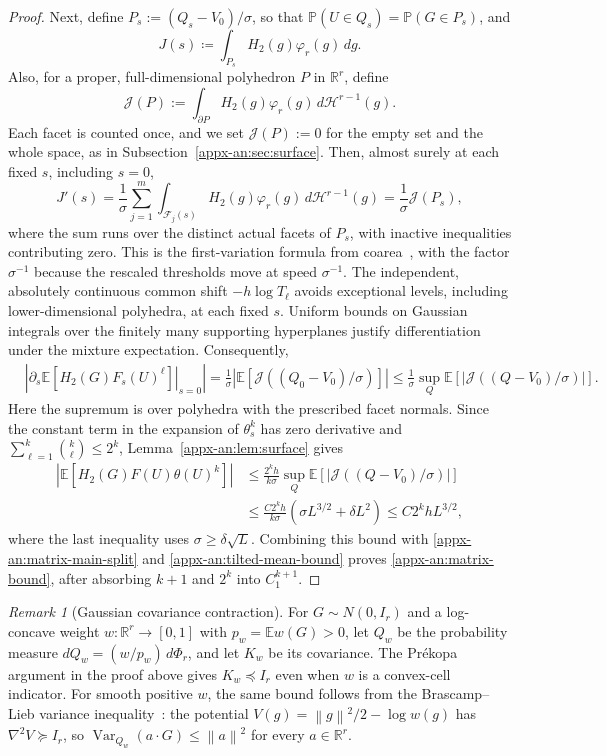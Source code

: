 \documentclass[11pt,letterpaper]{article}
\theoremstyle{remark}
\newtheorem{remark}{Remark}
\newcommand{\E}{\mathbb E}
\newcommand{\Pp}{\mathbb P}
\newcommand{\R}{\mathbb R}
\newcommand{\norm}[1]{\left\lVert#1\right\rVert}
\newcommand{\dd}{\,d}
\newcommand{\surf}{\mathcal J}
\begin{document}
\begin{proof}
Next, define $P_s :=(Q_s-V_0)/\sigma$, so that $\Pp(U\in Q_s) = \Pp(G\in P_s)$, and
\[
 J(s)\coloneqq
 \int_{P_s}H_2(g)\varphi_r(g)\,dg.
\]
Also, for a proper, full-dimensional polyhedron $P$ in $\R^r$, define
\[
\surf(P) :=\int_{\partial P}H_2(g)\varphi_r(g)\dd\mathcal H^{r-1}(g).
\]
Each facet is counted once, and we set $\surf(P):=0$ for the empty
set and the whole space, as in Subsection~\ref{appx-an:sec:surface}.
Then, almost surely at each fixed $s$, including $s=0$,
\[
 J'(s)=\frac1\sigma
 \sum_{j=1}^m
 \int_{\mathcal F_j(s)}
 H_2(g)\varphi_r(g)\,d\mathcal H^{r-1}(g)
 =\frac1\sigma\surf(P_s),
\]
where the sum runs over the distinct actual facets of $P_s$, with
inactive inequalities contributing zero. This is the first-variation
formula from coarea~\cite[Section~3.4]{EvansGariepy2015}, with the
factor $\sigma^{-1}$ because the rescaled thresholds move at speed
$\sigma^{-1}$. The independent, absolutely continuous common shift
$-h\log T_\ell$ avoids exceptional levels, including lower-dimensional
polyhedra, at each fixed $s$. Uniform bounds on Gaussian integrals
over the finitely many supporting hyperplanes justify differentiation
under the mixture expectation. Consequently,
\[
 \begin{aligned}
 &\left|
 \left.\partial_s
 \E[H_2(G)F_s(U)^\ell]
 \right|_{s=0}\right|
 =
 \frac1\sigma\left|
 \E[\surf((Q_0-V_0)/\sigma)]
 \right|
 \le
 \frac1\sigma\sup_Q
 \E[\left|\surf((Q-V_0)/\sigma)\right|].
 \end{aligned}
\]
Here the supremum is over polyhedra with the
prescribed facet normals. Since the constant term
in the expansion of $\theta_s^k$ has zero
derivative and
$\sum_{\ell=1}^k\binom{k}{\ell}\le2^k$,
Lemma~\ref{appx-an:lem:surface} gives
\[
 \begin{aligned}
 \left|\E[H_2(G)F(U)\theta(U)^k]\right|
 &\le\frac{2^kh}{k\sigma}
 \sup_Q\E[ \left|\surf((Q-V_0)/\sigma)\right|]\\
 &\le\frac{C2^kh}{k\sigma}
 (\sigma L^{3/2}+\delta L^2)
 \le C2^khL^{3/2},
 \end{aligned}
\]
where the last inequality uses
$\sigma\ge\delta\sqrt L$.
Combining this bound with
\eqref{appx-an:matrix-main-split} and
\eqref{appx-an:tilted-mean-bound} proves
\eqref{appx-an:matrix-bound}, after absorbing
$k+1$ and $2^k$ into $C_1^{k+1}$.
\end{proof}

\begin{remark}[Gaussian covariance contraction]\label{appx-rem:covariance-contraction}
For \(G\sim N(0,I_r)\) and a log-concave weight \(w:\R^r\to[0,1]\) with
\(p_w=\E w(G)>0\), let \(Q_w\) be the probability measure
\(dQ_w=(w/p_w)\,d\Phi_r\), and let \(K_w\) be its covariance.
The Pr\'ekopa argument in the proof above gives \(K_w\preceq I_r\)
even when \(w\) is a convex-cell indicator. For smooth positive
\(w\), the same bound follows from the Brascamp--Lieb variance
inequality~\cite{BrascampLieb1976}: the potential
\(V(g)=\norm g^2/2-\log w(g)\) has \(\nabla^2V\succeq I_r\),
so \(\operatorname{Var}_{Q_w}(a\cdot G)\le\norm a^2\) for every
\(a\in\R^r\).
\end{remark}
\end{document}
